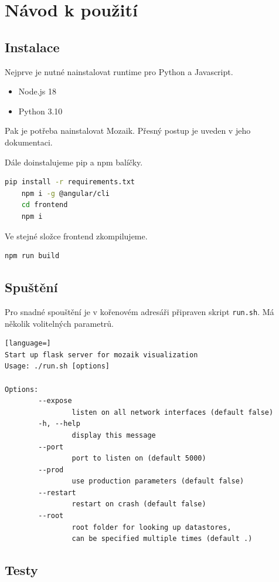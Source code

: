 \chapter{Návod k použití}
\label{chap:howto}

\section{Instalace}

Nejprve je nutné nainstalovat runtime pro Python a Javascript.

\begin{itemize}
	\item Node.js 18
	\item Python 3.10
\end{itemize}

Pak je potřeba nainstalovat Mozaik. Přesný postup je uveden v jeho dokumentaci\cite{MozaikReadme}.

Dále doinstalujeme pip a npm balíčky.

\begin{lstlisting}[language=bash]
	pip install -r requirements.txt
	npm i -g @angular/cli
	cd frontend
	npm i
\end{lstlisting}

Ve stejné složce frontend zkompilujeme.

\begin{lstlisting}[language=bash]
	npm run build
\end{lstlisting}

\section{Spuštění}

Pro snadné spouštění je v kořenovém adresáři připraven skript \lstinline|run.sh|. Má několik volitelných parametrů.

\begin{lstlisting}[language=]
Start up flask server for mozaik visualization
Usage: ./run.sh [options]

Options:
		--expose
				listen on all network interfaces (default false)
		-h, --help
				display this message
		--port
				port to listen on (default 5000)
		--prod
				use production parameters (default false)
		--restart
				restart on crash (default false)
		--root
				root folder for looking up datastores,
				can be specified multiple times (default .)
\end{lstlisting}

\section{Testy}

